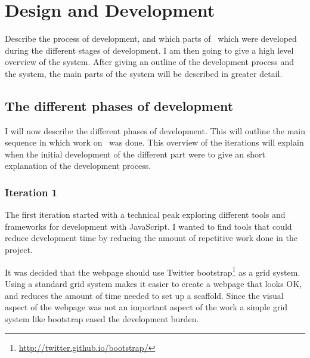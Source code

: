
\chapter{Design and Development} %

\label{DesignAndDevelopment} %



Describe the process of development,
and which parts of \theartefact\ which were developed during the different stages of development.
I am then going to give a high level overview of the system.
After giving an outline of the development process and the system,
the main parts of the system will be described in greater detail.

\section{The different phases of development}
I will now describe the different phases of development.
This will outline the main sequence in which work on \theartefact\ was done.
This overview of the iterations will explain when the initial development of
the different part were to give an short explanation of the development process.

\subsection{Iteration 1}
The first iteration started with a technical peak exploring different tools and frameworks for development with JavaScript.
I wanted to find tools that could reduce development time by reducing the amount of repetitive work done in the project.

It was decided that the webpage should use Twitter bootstrap\footnote{\url{http://twitter.github.io/bootstrap/}} as a grid system.
Using a standard grid system makes it easier to create a webpage that looks OK,
and reduces the amount of time needed to set up a scaffold.
Since the visual aspect of the webpage was not an important aspect of the work a simple grid system like bootstrap
eased the development burden.

